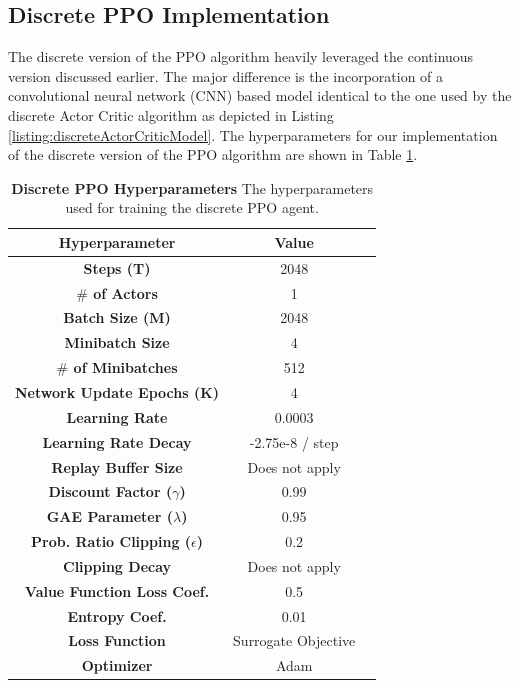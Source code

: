 \documentclass[conference]{IEEEtran}
\begin{document}
\subsection{Discrete PPO Implementation}
The discrete version of the PPO algorithm heavily leveraged the continuous version discussed earlier. The major difference is the incorporation of a convolutional neural network (CNN) based model identical to the one used by the discrete Actor Critic algorithm as depicted in Listing \ref{listing:discreteActorCriticModel}. The hyperparameters for our implementation of the discrete version of the PPO algorithm are shown in Table \ref{table:discretePPOHypers}.

\begin{table}[htbp]
    \caption{\textbf{Discrete PPO Hyperparameters}  The hyperparameters used for training the discrete PPO agent.}
\begin{center}
\begin{tabular}{|c|c|c|}
\hline
\textbf{Hyperparameter} & \textbf{Value} \\
\hline
\textbf{Steps (T)} & 2048 \\
\hline
\textbf{$\#$ of Actors} & 1 \\
\hline
\textbf{Batch Size (M)} & 2048 \\
\hline
\textbf{Minibatch Size} & 4 \\
\hline
\textbf{$\#$ of Minibatches} & 512 \\
\hline
\textbf{Network Update Epochs (K)} & 4 \\
\hline
\textbf{Learning Rate} & 0.0003 \\
\hline
\textbf{Learning Rate Decay} & -2.75e-8 / step \\
\hline
\textbf{Replay Buffer Size} & Does not apply \\
\hline
\textbf{Discount Factor ($\gamma$)} & 0.99 \\
\hline
\textbf{GAE Parameter ($\lambda$)} & 0.95 \\
\hline
\textbf{Prob. Ratio Clipping ($\epsilon$)} & 0.2\\
\hline
\textbf{Clipping Decay} & Does not apply \\
\hline
\textbf{Value Function Loss Coef.} & 0.5 \\
\hline
\textbf{Entropy Coef.} & 0.01 \\
\hline
\textbf{Loss Function} & Surrogate Objective \\
\hline
\textbf{Optimizer} & Adam \\
\hline
\end{tabular}
\label{table:discretePPOHypers}
\end{center}
\end{table}
\end{document}
